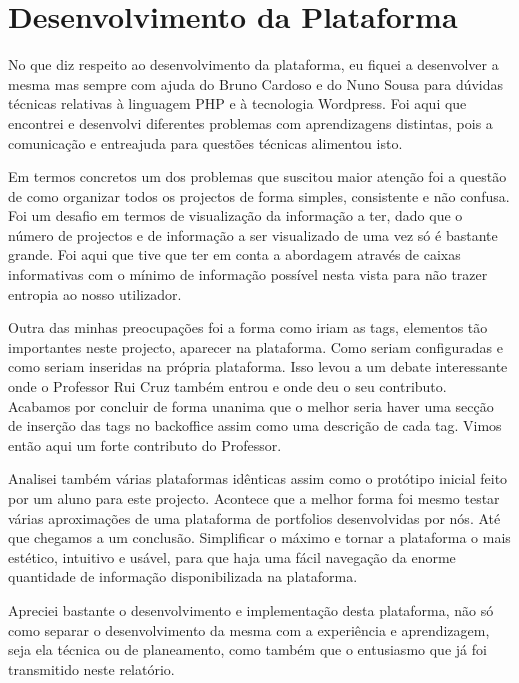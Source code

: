 \documentclass[a4paper,12pt,journal,twoside,compsoc]{PPIEEEtran}
\begin{document}

\section{Desenvolvimento da Plataforma}

No que diz respeito ao desenvolvimento da plataforma, eu fiquei a desenvolver a mesma mas sempre com ajuda do Bruno Cardoso e do Nuno Sousa para dúvidas técnicas relativas à linguagem PHP e à tecnologia Wordpress. Foi aqui que encontrei e desenvolvi diferentes problemas com aprendizagens distintas, pois a comunicação e entreajuda para questões técnicas alimentou isto.

Em termos concretos um dos problemas que suscitou maior atenção foi a questão de como organizar todos os projectos de forma simples, consistente e não confusa. Foi um desafio em termos de visualização da informação a ter, dado que o número de projectos e de informação a ser visualizado de uma vez só é bastante grande. Foi aqui que tive que ter em conta a abordagem através de caixas informativas com o mínimo de informação possível nesta vista para não trazer entropia ao nosso utilizador.

Outra das minhas preocupações foi a forma como iriam as tags, elementos tão importantes neste projecto, aparecer na plataforma. Como seriam configuradas e como seriam inseridas na própria plataforma. Isso levou a um debate interessante onde o Professor Rui Cruz também entrou e onde deu o seu contributo. Acabamos por concluir de forma unanima que o melhor seria haver uma secção de inserção das tags no backoffice assim como uma descrição de cada tag. Vimos então aqui um forte contributo do Professor.

Analisei também várias plataformas idênticas assim como o protótipo inicial feito por um aluno para este projecto. Acontece que a melhor forma foi mesmo testar várias aproximações de uma plataforma de portfolios desenvolvidas por nós. Até que chegamos a um conclusão. Simplificar o máximo e tornar a plataforma o mais estético, intuitivo e usável, para que haja uma fácil navegação da enorme quantidade de informação disponibilizada na plataforma.

Apreciei bastante o desenvolvimento e implementação desta plataforma, não só como separar o desenvolvimento da mesma com a experiência e aprendizagem, seja ela técnica ou de planeamento, como também que o entusiasmo que já foi transmitido neste relatório.
\end{document}
